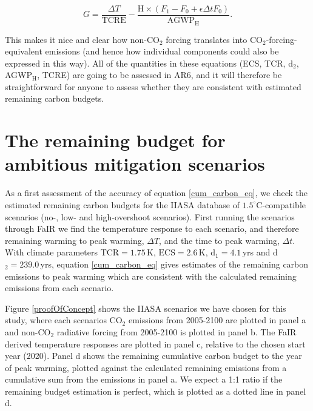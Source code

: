 \documentclass[11pt]{article}
\begin{document}
\begin{equation} \label{cum_carbon_eq}
    G = \frac{\Delta T}{\text{TCRE}} - \frac{\text{H} \times (F_1 - F_0 + \epsilon\Delta t F_0)}{\text{AGWP}_{\text{H}}}.
\end{equation}

This makes it nice and clear how non-CO$_2$ forcing translates into CO$_2$-forcing-equivalent emissions (and hence how individual components could also be expressed in this way). All of the quantities in these equations (ECS, TCR, d$_2$, AGWP$_\text{H}$, TCRE) are going to be assessed in AR6, and it will therefore be straightforward for anyone to assess whether they are consistent with estimated remaining carbon budgets.

\section{The remaining budget for ambitious mitigation scenarios}

As a first assessment of the accuracy of equation \ref{cum_carbon_eq}, we check the estimated remaining carbon budgets for the IIASA database of $1.5^{\circ}$C-compatible scenarios (no-, low- and high-overshoot scenarios). First running the scenarios through FaIR we find the temperature response to each scenario, and therefore remaining warming to peak warming, $\Delta T$, and the time to peak warming, $\Delta t$. With climate parameters $\text{TCR} = 1.75$\,K, $\text{ECS} = 2.6\,$K, d$_1 = 4.1$\,yrs and d$_2 = 239.0$\,yrs, equation \ref{cum_carbon_eq} gives estimates of the remaining carbon emissions to peak warming which are consistent with the calculated remaining emissions from each scenario. 

Figure \ref{proofOfConcept} shows the IIASA scenarios we have chosen for this study, where each scenarios CO$_2$ emissions from 2005-2100 are plotted in panel a and non-CO$_2$ radiative forcing from 2005-2100 is plotted in panel b. The FaIR derived temperature responses are plotted in panel c, relative to the chosen start year (2020). Panel d shows the remaining cumulative carbon budget to the year of peak warming, plotted against the calculated remaining emissions from a cumulative sum from the emissions in panel a. We expect a 1:1 ratio if the remaining budget estimation is perfect, which is plotted as a dotted line in panel d. 
\end{document}
